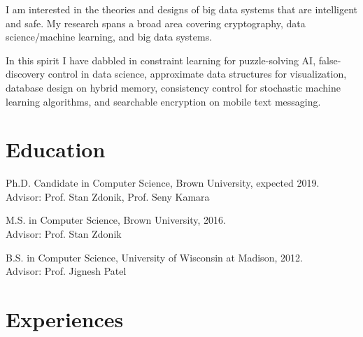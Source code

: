 \documentclass[letterpaper]{article}
\renewenvironment{itemize}{
  \begin{list}{}{
    \setlength{\leftmargin}{1.5em}
  }
}{
  \end{list}
}
\begin{document}
I am interested in the theories and designs of big data systems that are intelligent and safe. My research spans a broad area covering cryptography, data science/machine learning, and big data systems.  

In this spirit I have dabbled in constraint learning for puzzle-solving AI, false-discovery control in data science, approximate data structures for visualization, database design on hybrid memory, consistency control for stochastic machine learning algorithms, and searchable encryption on mobile text messaging. 

\section*{Education}

\begin{itemize}
  \item Ph.D. Candidate in Computer Science, Brown University, expected 2019.\\
  Advisor: Prof. Stan Zdonik, Prof. Seny Kamara
  \item M.S. in Computer Science, Brown University, 2016.\\
  Advisor: Prof. Stan Zdonik
  \item B.S. in Computer Science, University of Wisconsin at Madison, 2012.\\
  Advisor: Prof. Jignesh Patel
\end{itemize}


\section*{Experiences}
\end{document}
